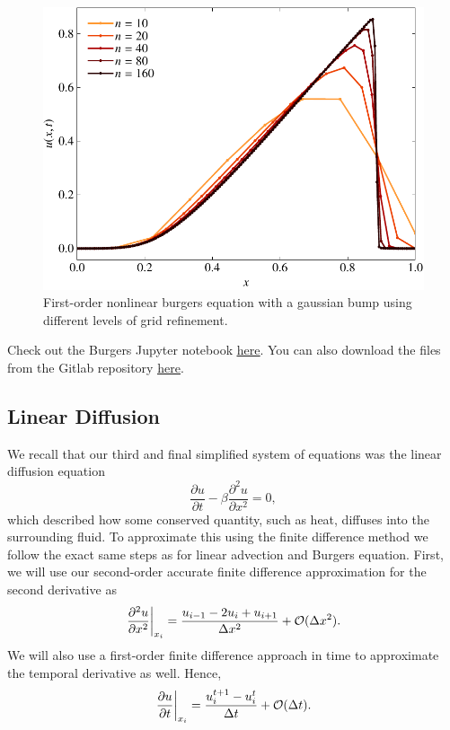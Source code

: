 \begin{figure}[htbp]
	\centering
	\includegraphics[width=0.65\linewidth]{Pictures/burgers_upwind}
	\caption{First-order nonlinear burgers equation with a gaussian bump using different levels of grid refinement.}
	\label{fig:burgers_upwind}
\end{figure}
\begin{jupyternote}
	Check out the Burgers Jupyter notebook \href{\binderurl}{\underline{here}}. You can also download the files from the Gitlab repository \href{\repourl}{\underline{here}}.
\end{jupyternote}

\subsection{Linear Diffusion}
We recall that our third and final simplified system of equations was the linear diffusion equation
\begin{equation}
\frac{\partial u}{\partial t} - \beta \frac{\partial^2 u}{\partial x^2} = 0,
\end{equation}
which described how some conserved quantity, such as heat, diffuses into the surrounding fluid. To approximate this using the finite difference method we follow the exact same steps as for linear advection and Burgers equation. First, we will use our second-order accurate finite difference approximation for the second derivative as
\begin{equation}
	\left.\frac{\partial^2 u}{\partial x^2}\right\rvert_{x_i}^{} = \frac{u_{i-1} - 2u_i + u_{i+1}}{\Delta x^2} + \mathcal{O}(\Delta x^2).
\end{equation}
We will also use a first-order finite difference approach in time to approximate the temporal derivative as well. Hence,
\begin{equation}
	\left.\frac{\partial u}{\partial t}\right\rvert_{x_i}^{} = \frac{u_i^{t+1} - u_{i}^t}{\Delta t} + \mathcal{O}(\Delta t).
\end{equation}

